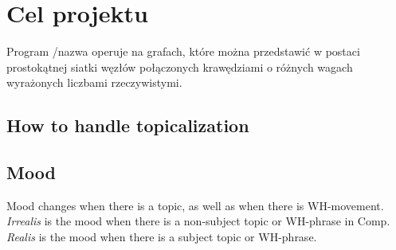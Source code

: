 \documentclass[12pt]{article}
\begin{document}
\section{Cel projektu}

Program /nazwa operuje na grafach, które można przedstawić w postaci prostokątnej siatki węzłów połączonych krawędziami o różnych wagach wyrażonych liczbami rzeczywistymi.


\subsection*{How to handle topicalization}



\subsection*{Mood}

Mood changes when there is a topic, as well as when
there is WH-movement.  \emph{Irrealis} is the mood when
there is a non-subject topic or WH-phrase in Comp.
\emph{Realis} is the mood when there is a subject topic
or WH-phrase.
\end{document}
